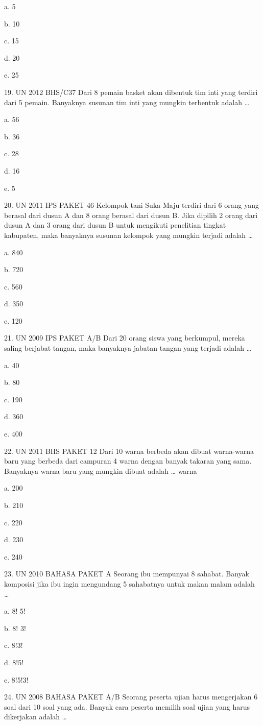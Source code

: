 \documentclass[11pt,fleqn]{book} %
\begin{document}
a.	5

b.	10

c.	15

d.	20

e.	25

19.	UN 2012 BHS/C37 
Dari 8 pemain basket akan dibentuk tim inti yang terdiri dari 5 pemain. Banyaknya susunan tim inti yang mungkin terbentuk adalah …

a.	56

b.	36

c.	28

d.	16

e.	5

20.	UN 2011 IPS PAKET 46 
Kelompok tani Suka Maju terdiri dari 6 orang yang berasal dari dusun A dan 8 orang berasal dari dusun B. Jika dipilih 2 orang dari dusun A dan 3 orang dari dusun B untuk mengikuti penelitian tingkat kabupaten, maka banyaknya susunan kelompok yang mungkin terjadi adalah …

a.	840

b.	720

c.	560

d.	350

e.	120

21.	UN 2009 IPS PAKET A/B 
Dari 20 orang siswa yang berkumpul, mereka saling berjabat tangan, maka banyaknya jabatan tangan yang terjadi adalah …

a.	40

b.	80


c.	190

d.	360

e.	400

22.	UN 2011 BHS PAKET 12 
Dari 10 warna berbeda akan dibuat warna-warna baru yang berbeda dari campuran 4 warna dengan banyak takaran yang sama. Banyaknya warna baru yang mungkin dibuat adalah … warna

a.	200

b.	210

c.	220

d.	230

e.	240

23.	UN 2010 BAHASA PAKET A 
Seorang ibu mempunyai 8 sahabat. Banyak komposisi jika ibu ingin mengundang 5 sahabatnya untuk makan malam adalah …

a.	8! 5! 

b.	8! 3! 

c.	8!3!

d.	8!5!

e.	8!5!3!

24.	UN 2008 BAHASA PAKET A/B 
Seorang peserta ujian harus mengerjakan 6 soal dari 10 soal yang ada. Banyak cara peserta memilih soal ujian yang harus dikerjakan adalah …
\end{document}
